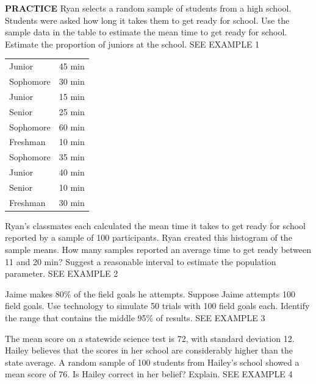 \documentclass{article}
\newenvironment{practice}[2]{}{}        %
\newcommand{\answer}[1]{}               %
\newcommand{\placeholder}[2]{}          %
\begin{document}
\begin{practice}{14}{1}
\textbf{PRACTICE} Ryan selects a random sample of students from a high school. Students were asked how long it takes them to get ready for school. Use the sample data in the table to estimate the mean time to get ready for school. Estimate the proportion of juniors at the school. SEE EXAMPLE 1
\begin{tabular}{ll}
Junior & 45 min \\
Sophomore & 30 min \\
Junior & 15 min \\
Senior & 25 min \\
Sophomore & 60 min \\
Freshman & 10 min \\
Sophomore & 35 min \\
Junior & 40 min \\
Senior & 10 min \\
Freshman & 30 min \\
\end{tabular}
\answer{30 min; 30\%}
\end{practice}
\begin{practice}{15}{2}
Ryan's classmates each calculated the mean time it takes to get ready for school reported by a sample of 100 participants. Ryan created this histogram of the sample means. How many samples reported an average time to get ready between 11 and 20 min? Suggest a reasonable interval to estimate the population parameter. SEE EXAMPLE 2
\placeholder{graph}{Means of 50 Samples: green histogram. Horizontal Time to Get Ready for School (min), bins 0–10,11–20,21–30,31–40,41–50,51–60. Vertical Number of Samples 0 to 16 every 2. Bar heights 1,10,15,14,8,2. No arrows.}
\answer{10 samples had an average time to get ready for school between 11 and 20 minutes. The parameter, average time to get ready for school, is likely to fall between 11 and 50 minutes.}
\end{practice}
\begin{practice}{16}{2}
Jaime makes 80\% of the field goals he attempts. Suppose Jaime attempts 100 field goals. Use technology to simulate 50 trials with 100 field goals each. Identify the range that contains the middle 95\% of results. SEE EXAMPLE 3
\answer{95\% of the mean number of successes from 50 trials fell between 75\% and 85.9\%. (Answers may vary slightly. Accept all reasonable responses.)}
\end{practice}
\begin{practice}{17}{2}
The mean score on a statewide science test is 72, with standard deviation 12. Hailey believes that the scores in her school are considerably higher than the state average. A random sample of 100 students from Hailey's school showed a mean score of 76. Is Hailey correct in her belief? Explain. SEE EXAMPLE 4
\answer{About 95\% of random samples with 100 test scores will have mean values within (\frac{2(12)}{\sqrt{100}}=2.4) points of the population parameter, 72. The range of reasonable means is between 69.6 and 74.4. Since Hailey's sample mean is above the range of the reasonable means, she can conclude that students from her school scored better than the state average.}
\end{practice}
\end{document}
